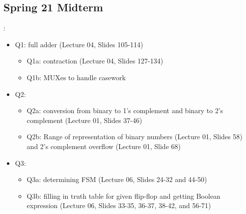 \documentclass{../slides}
\begin{document}
\subsection{Spring 21 Midterm}
\begin{frame}{\secname: \subsecname}
    \begin{itemize}
        \item Q1: full adder (Lecture 04, Slides 105-114)
        \begin{itemize}
            \item Q1a: contraction (Lecture 04, Slides 127-134)
            \item Q1b: MUXes to handle casework
        \end{itemize}
        \item Q2:
        \begin{itemize}
            \item Q2a: conversion from binary to 1’s complement and binary to 2’s complement (Lecture 01, Slides 37-46)
            \item Q2b: Range of representation of binary numbers (Lecture 01, Slides 58) and 2's complement overflow (Lecture 01, Slide 68)
        \end{itemize}
        \item Q3:
        \begin{itemize}
            \item Q3a: determining FSM (Lecture 06, Slides 24-32 and 44-50)
            \item Q3b: filling in truth table for given flip-flop and getting Boolean expression (Lecture 06, Slides 33-35, 36-37, 38-42, and 56-71)
        \end{itemize}
    \end{itemize}
\end{frame}
\end{document}
